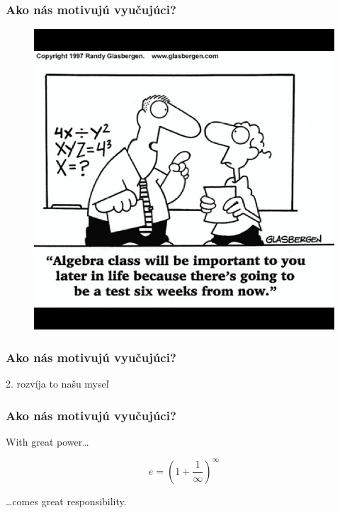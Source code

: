 \documentclass{beamer}
\begin{document}
\begin{frame}
\frametitle{Ako nás motivujú vyučujúci?}
\begin{figure}
\includegraphics[height=0.8\textheight]{images/will_help_in_real_life.jpg}
\end{figure}
\end{frame}

\begin{frame}
\frametitle{Ako nás motivujú vyučujúci?}
\begin{center}
{\Large 2. rozvíja to našu myseľ}
\end{center}
\end{frame}


\begin{frame}
\frametitle{Ako nás motivujú vyučujúci?}
{\Large

\begin{flushleft}
With great power\ldots
\end{flushleft}
$$e = \left(1 + \dfrac{1}{\infty}\right)^{\infty}$$
\begin{flushright}
\ldots comes great responsibility.
\end{flushright}

}
\end{frame}
\end{document}
